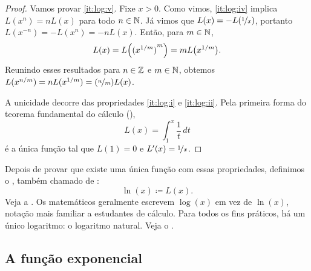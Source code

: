 \begin{proof}
Vamos provar \ref{it:log:v}.
Fixe $x > 0$.
Como vimos, \ref{it:log:iv} implica
$L(x^n) = n L(x)$
para todo $n \in {\mathbb{N}}$.
Já vimos que
$L(x) = - L(\nicefrac{1}{x})$,
portanto $L(x^{-n}) = - L(x^n) = -n L(x)$. Então, para $m \in {\mathbb{N}}$,
\begin{equation*}
L(x) = L\Bigl({(x^{1/m})}^m\Bigr) = m L\bigl(x^{1/m}\bigr) .
\end{equation*}
Reunindo esses resultados para $n \in {\mathbb{Z}}$ e $m \in {\mathbb{N}}$, obtemos
$L(x^{n/m}) = n L(x^{1/m}) = (\nicefrac{n}{m}) L(x)$.

A unicidade decorre das propriedades \ref{it:log:i} e
\ref{it:log:ii}. Pela primeira forma do teorema fundamental do cálculo
(),
\begin{equation*}
L(x) = \int_1^x \frac{1}{t}\,dt
\end{equation*}
é a única função tal que $L(1) = 0$ e $L'(x) = \nicefrac{1}{x}$.
\end{proof}

Depois de provar que existe uma única função com essas propriedades,
definimos o \emph{}, também chamado de
\emph{}:
\begin{equation*}
\ln(x) \coloneqq L(x) .
\end{equation*}
Veja a .
Os matemáticos geralmente escrevem $\log(x)$ em vez de $\ln(x)$, notação
mais familiar a estudantes de cálculo. Para todos os fins práticos, há um
único logaritmo: o logaritmo natural. Veja o .
\begin{myfigureht}
\caption{Gráfico de $\ln(x)$ junto com $\nicefrac{1}{x}$, mostrando o valor
de $\ln(4)$.\label{fig:log}}
\end{myfigureht}

\subsection{A função exponencial}

